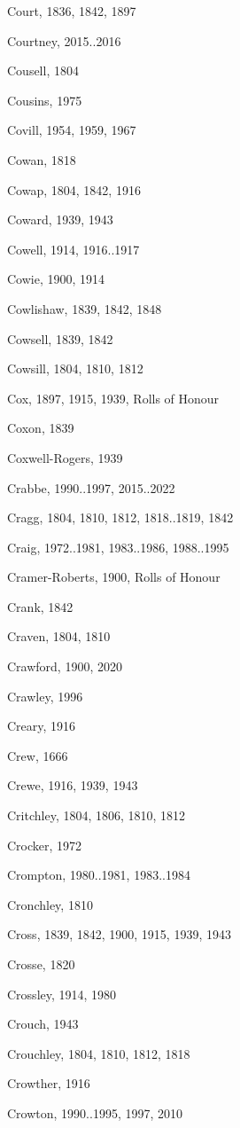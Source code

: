 \begin{theindex}
\item Court, 1836, 1842, 1897
\item Courtney, 2015..2016
\item Cousell, 1804
\item Cousins, 1975
\item Covill, 1954, 1959, 1967
\item Cowan, 1818
\item Cowap, 1804, 1842, 1916
\item Coward, 1939, 1943
\item Cowell, 1914, 1916..1917
\item Cowie, 1900, 1914
\item Cowlishaw, 1839, 1842, 1848
\item Cowsell, 1839, 1842
\item Cowsill, 1804, 1810, 1812
\item Cox, 1897, 1915, 1939, Rolls of Honour
\item Coxon, 1839
\item Coxwell-Rogers, 1939
\item Crabbe, 1990..1997, 2015..2022
\item Cragg, 1804, 1810, 1812, 1818..1819, 1842
\item Craig, 1972..1981, 1983..1986, 1988..1995
\item Cramer-Roberts, 1900, Rolls of Honour
\item Crank, 1842
\item Craven, 1804, 1810
\item Crawford, 1900, 2020
\item Crawley, 1996
\item Creary, 1916
\item Crew, 1666
\item Crewe, 1916, 1939, 1943
\item Critchley, 1804, 1806, 1810, 1812
\item Crocker, 1972
\item Crompton, 1980..1981, 1983..1984
\item Cronchley, 1810
\item Cross, 1839, 1842, 1900, 1915, 1939, 1943
\item Crosse, 1820
\item Crossley, 1914, 1980
\item Crouch, 1943
\item Crouchley, 1804, 1810, 1812, 1818
\item Crowther, 1916
\item Crowton, 1990..1995, 1997, 2010

\end{theindex}
